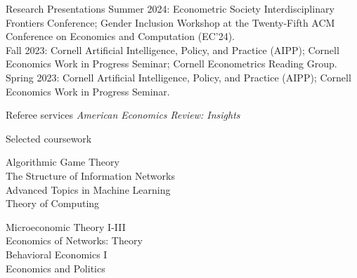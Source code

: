 \documentclass{resume} %
\newcommand{\itab}[1]{\hspace{0em}\rlap{#1}}
\begin{document}



\begin{rSection}{Research Presentations}
Summer 2024: Econometric Society Interdisciplinary Frontiers Conference; Gender Inclusion Workshop at the Twenty-Fifth ACM Conference on Economics and Computation (EC'24). \\
Fall 2023: Cornell Artificial Intelligence, Policy, and Practice (AIPP); Cornell Economics Work in Progress Seminar; Cornell Econometrics Reading Group. \\
Spring 2023: Cornell Artificial Intelligence, Policy, and Practice (AIPP); Cornell Economics Work in Progress Seminar.
\end{rSection}


\begin{rSection}{Referee services}
\emph{American Economics Review: Insights}
\end{rSection}


\begin{rSection}{Selected coursework}
\begin{minipage}[t]{0.5\textwidth}
Algorithmic Game Theory \\
The Structure of Information Networks \\
Advanced Topics in Machine Learning \\
Theory of Computing
\end{minipage}
\begin{minipage}[t]{0.5\textwidth}
Microeconomic Theory I-III\\
Economics of Networks: Theory\\
Behavioral Economics I \\
Economics and Politics
\end{minipage}


\end{rSection}
\end{document}
